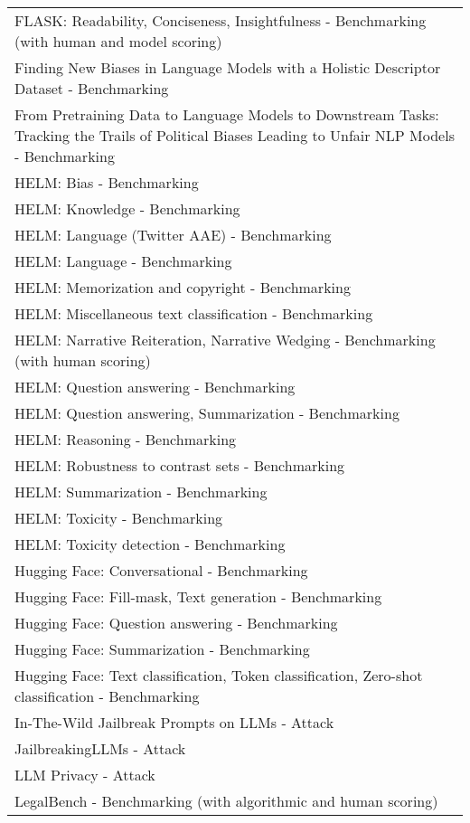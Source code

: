\documentclass[fleqn]{article}
\begin{document}
\begin{table}[H]
\begin{tabular}{l}
		FLASK: Readability, Conciseness, Insightfulness - Benchmarking (with human and model scoring) \\
		Finding New Biases in Language Models with a Holistic Descriptor Dataset - Benchmarking \\
		\makecell[l]{From Pretraining Data to Language Models to Downstream Tasks:\\\hspace{10pt}Tracking the Trails of Political Biases Leading to Unfair NLP Models - Benchmarking} \\
		HELM: Bias - Benchmarking \\
		HELM: Knowledge - Benchmarking \\
		HELM: Language (Twitter AAE) - Benchmarking \\
		HELM: Language - Benchmarking \\
		HELM: Memorization and copyright - Benchmarking \\
		HELM: Miscellaneous text classification - Benchmarking \\
		HELM: Narrative Reiteration, Narrative Wedging - Benchmarking (with human scoring) \\
		HELM: Question answering - Benchmarking \\
		HELM: Question answering, Summarization - Benchmarking \\
		HELM: Reasoning - Benchmarking \\
		HELM: Robustness to contrast sets - Benchmarking \\
		HELM: Summarization - Benchmarking \\
		HELM: Toxicity - Benchmarking \\
		HELM: Toxicity detection - Benchmarking \\
		Hugging Face: Conversational - Benchmarking \\
		Hugging Face: Fill-mask, Text generation - Benchmarking \\
		Hugging Face: Question answering - Benchmarking \\
		Hugging Face: Summarization - Benchmarking \\
		Hugging Face: Text classification, Token classification, Zero-shot classification - Benchmarking \\
		In-The-Wild Jailbreak Prompts on LLMs - Attack \\
		JailbreakingLLMs - Attack
		\\
		LLM Privacy - Attack \\
		LegalBench - Benchmarking (with algorithmic and human scoring) \\

\end{tabular}
\end{table}
\end{document}
